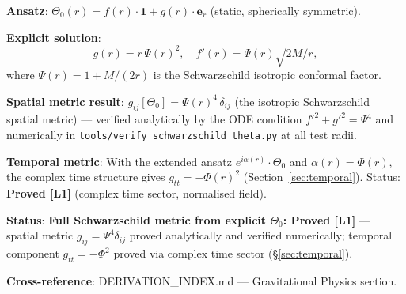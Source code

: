 \documentclass[11pt,a4paper]{article}
\theoremstyle{definition}
\theoremstyle{remark}
\begin{document}
\begin{tcolorbox}[colback=green!5!white,colframe=green!75!black,
                  title={Summary}]
\textbf{Ansatz}: $\Theta_0(r) = f(r)\cdot\mathbf{1} + g(r)\cdot\boldsymbol{e}_r$
(static, spherically symmetric).

\medskip
\textbf{Explicit solution}:
\[
  g(r) = r\,\Psi(r)^2, \quad
  f'(r) = \Psi(r)\sqrt{2M/r},
\]
where $\Psi(r) = 1 + M/(2r)$ is the Schwarzschild isotropic conformal factor.

\medskip
\textbf{Spatial metric result}: $g_{ij}[\Theta_0] = \Psi(r)^4\,\delta_{ij}$
(the isotropic Schwarzschild spatial metric) — verified analytically by the
ODE condition $f'^2 + g'^2 = \Psi^4$ and numerically in
\texttt{tools/verify\_schwarzschild\_theta.py} at all test radii.

\medskip
\textbf{Temporal metric}: With the extended ansatz $e^{i\alpha(r)}\cdot\Theta_0$
and $\alpha(r) = \Phi(r)$, the complex time structure gives
$g_{tt} = -\Phi(r)^2$ (Section~\ref{sec:temporal}).
Status: \textbf{Proved [L1]} (complex time sector, normalised field).

\medskip
\textbf{Status}: \textbf{Full Schwarzschild metric from explicit $\Theta_0$:
Proved [L1]} — spatial metric $g_{ij}=\Psi^4\delta_{ij}$ proved analytically and
verified numerically; temporal component $g_{tt}=-\Phi^2$ proved via complex
time sector (§\ref{sec:temporal}).

\medskip
\textbf{Cross-reference}: DERIVATION\_INDEX.md --- Gravitational Physics section.
\end{tcolorbox}
\end{document}
